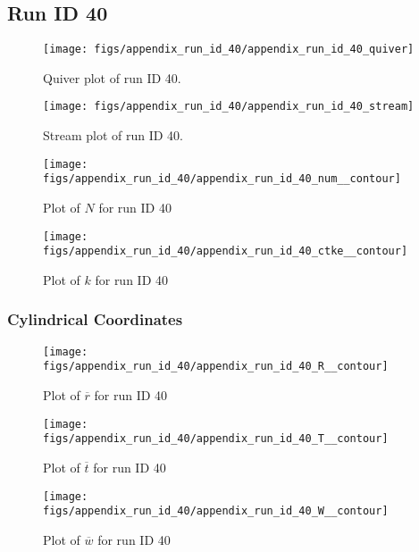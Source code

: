 \subsection{Run ID 40}
\begin{figure}[H]
\centering
\texttt{[image: figs/appendix\_run\_id\_40/appendix\_run\_id\_40\_quiver]}
\caption{Quiver plot of run ID 40.}
\label{fig:appendix_run_id_40_quiver}
\end{figure}


\begin{figure}[H]
\centering
\texttt{[image: figs/appendix\_run\_id\_40/appendix\_run\_id\_40\_stream]}
\caption{Stream plot of run ID 40.}
\label{fig:appendix_run_id_40_stream}
\end{figure}


\begin{figure}[H]
\centering
\texttt{[image: figs/appendix\_run\_id\_40/appendix\_run\_id\_40\_num\_\_contour]}
\caption{Plot of $N$ for run ID 40}
\label{fig:appendix_run_id_40_num__contour}
\end{figure}


\begin{figure}[H]
\centering
\texttt{[image: figs/appendix\_run\_id\_40/appendix\_run\_id\_40\_ctke\_\_contour]}
\caption{Plot of $k$ for run ID 40}
\label{fig:appendix_run_id_40_ctke__contour}
\end{figure}


\subsubsection{Cylindrical Coordinates}
\begin{figure}[H]
\centering
\texttt{[image: figs/appendix\_run\_id\_40/appendix\_run\_id\_40\_R\_\_contour]}
\caption{Plot of $\overline{r}$ for run ID 40}
\label{fig:appendix_run_id_40_R__contour}
\end{figure}


\begin{figure}[H]
\centering
\texttt{[image: figs/appendix\_run\_id\_40/appendix\_run\_id\_40\_T\_\_contour]}
\caption{Plot of $\overline{t}$ for run ID 40}
\label{fig:appendix_run_id_40_T__contour}
\end{figure}


\begin{figure}[H]
\centering
\texttt{[image: figs/appendix\_run\_id\_40/appendix\_run\_id\_40\_W\_\_contour]}
\caption{Plot of $\overline{w}$ for run ID 40}
\label{fig:appendix_run_id_40_W__contour}
\end{figure}


